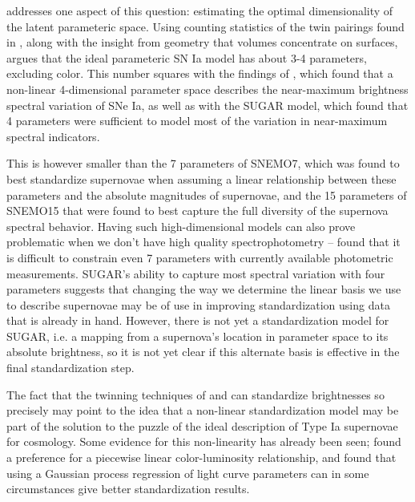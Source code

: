 \citet{rubin_constraining_2020} addresses one aspect of this question: estimating the optimal dimensionality of the latent parameteric space. Using counting statistics of the twin pairings found in \cite{fakhouri_improving_2015}, along with the insight from geometry that volumes concentrate on surfaces, \citeauthor{rubin_constraining_2020} argues that the ideal parameteric SN Ia model has about 3-4 parameters, excluding color. This number squares with the findings of \citet{boone_twins_2020a}, which found that a non-linear 4-dimensional parameter space describes the near-maximum brightness spectral variation of SNe Ia, as well as with the SUGAR model, which found that 4 parameters were sufficient to model most of the variation in near-maximum spectral indicators.

This is however smaller than the 7 parameters of SNEMO7, which was found to best standardize supernovae when assuming a linear relationship between these parameters and the absolute magnitudes of supernovae, and the 15 parameters of SNEMO15 that were found to best capture the full diversity of the supernova spectral behavior. Having such high-dimensional models can also prove problematic when we don't have high quality spectrophotometry -- \citet{rose_initial_2020} found that it is difficult to constrain even 7 parameters with currently available photometric measurements. SUGAR's ability to capture most spectral variation with four parameters suggests that changing the way we determine the linear basis we use to describe supernovae may be of use in improving standardization using data that is already in hand. However, there is not yet a standardization model for SUGAR, i.e. a mapping from a supernova's location in parameter space to its absolute brightness, so it is not yet clear if this alternate basis is effective in the final standardization step.

The fact that the twinning techniques of \citet{fakhouri_improving_2015} and \citet{boone_twins_2020b} can standardize brightnesses so precisely may point to the idea that a non-linear standardization model may be part of the solution to the puzzle of the ideal description of Type Ia supernovae for cosmology. Some evidence for this non-linearity has already been seen; \citet{rubin_unity_2015} found a preference for a piecewise linear color-luminosity relationship, and \citet{kim_standardizing_2013} found that using a Gaussian process regression of light curve parameters can in some circumstances give better standardization results.

